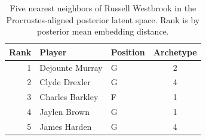 \begin{table}[htbp]
  \centering\small
  \begin{tabular}{rllc}
    \toprule
    Rank & Player & Position & Archetype \\
    \midrule
    1 & Dejounte Murray & G & 2 \\
    2 & Clyde Drexler & G & 4 \\
    3 & Charles Barkley & F & 1 \\
    4 & Jaylen Brown & G & 1 \\
    5 & James Harden & G & 4 \\
    \bottomrule
  \end{tabular}
  \caption{Five nearest neighbors of Russell Westbrook in the Procrustes-aligned posterior latent space. Rank is by posterior mean embedding distance.}
  \label{tab:Russell_Westbrook_neighbors}
\end{table}

